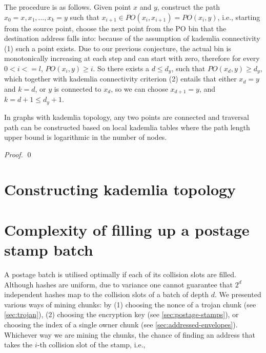 The procedure is as follows. Given point $x$ and $y$, construct the path $x_0=x , x_1, ..., x_k=y$ such that $x_{i+1}\in \mathit{PO}(x_i, x_{i+1})=\mathit{PO}(x_i, y)$, i.e., starting from the source point, choose the next point from the PO bin that the destination address falls into: because of the assumption of kademlia connectivity (1) such a point exists. Due to our previous conjecture, the actual bin is monotonically increasing at each step and can start with zero, therefore for every $0<i<=l$, $\mathit{PO}(x_{i}, y)\geq i$. So there exists a $d\leq d_y$, such that 
$\mathit{PO}(x_{d}, y)\geq d_y$, which together with kademlia connectivity criterion (2) entails that either $x_d=y$ and $k=d$, or $y$ is connected to $x_d$, so we can choose $x_{d+1}=y$, and $k=d+1\leq d_y+1$.

\begin{theorem}{In graphs with kademlia topology, any two points are connected and traversal path can be constructed based on local kademlia tables where the path length upper bound is logarithmic in the number of nodes.}

\begin{proof}



\qed
\end{proof}
\end{theorem}

\section{Constructing kademlia topology \statusred}

\section{Complexity of filling up a postage stamp batch \statusgreen}\label{sec:complexity-filling}

A postage batch is utilised optimally if each of its collision slots are filled. Although hashes are uniform, due to variance one cannot guarantee that $2^d$ independent hashes map to the collision slots of a batch of depth $d$.
We presented various ways of mining chunks: by (1) choosing the nonce of a trojan chunk (see \ref{sec:trojan}), (2) choosing the encryption key (see \ref{sec:postage-stamps}), or choosing the index of a single owner chunk (see \ref{sec:addressed-envelopes}). Whichever way we are mining the chunks, the chance of finding an address that takes the $i$-th collision slot of the stamp, i.e., 


